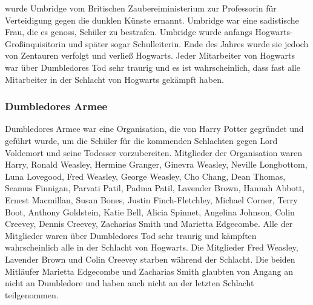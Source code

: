 \documentclass[a4paper, 10pt]{article}
\begin{document}
\vspace{10pt}
 wurde Umbridge vom Britischen Zaubereiministerium zur Professorin für Verteidigung gegen die dunklen Künste ernannt. Umbridge war eine sadistische Frau, die es genoss, Schüler zu bestrafen. Umbridge wurde anfangs Hogwarts-Großinquisitorin und später sogar Schulleiterin. Ende des Jahres wurde sie jedoch von Zentauren verfolgt und verließ Hogwarts.
\vspace{10pt}
\newline
Jeder Mitarbeiter von Hogwarts war über Dumbledores Tod sehr traurig und es ist wahrscheinlich, dass fast alle Mitarbeiter in der Schlacht von Hogwarts gekämpft haben.
\subsubsection*{\large Dumbledores Armee}
Dumbledores Armee war eine Organisation, die von Harry Potter gegründet und geführt wurde, um die Schüler für die kommenden Schlachten gegen Lord Voldemort und seine Todesser vorzubereiten.
\vspace{10pt}
\newline
Mitglieder der Organisation waren Harry, Ronald Weasley, Hermine Granger, Ginevra Weasley, Neville Longbottom, Luna Lovegood, Fred Weasley, George Weasley, Cho Chang, Dean Thomas, Seamus Finnigan, Parvati Patil, Padma Patil, Lavender Brown, Hannah Abbott, Ernest Macmillan, Susan Bones, Justin Finch-Fletchley, Michael Corner, Terry Boot, Anthony Goldstein, Katie Bell, Alicia Spinnet, Angelina Johnson, Colin Creevey, Dennis Creevey, Zacharias Smith und Marietta Edgecombe.
\vspace{10pt}
\newline
Alle der Mitglieder waren über Dumbledores Tod sehr traurig und kämpften wahrscheinlich alle in der Schlacht von Hogwarts. Die Mitglieder Fred Weasley, Lavender Brown und Colin Creevey starben während der Schlacht. Die beiden Mitläufer Marietta Edgecombe und Zacharias Smith glaubten von Angang an nicht an Dumbledore und haben auch nicht an der letzten Schlacht teilgenommen.
\end{document}
